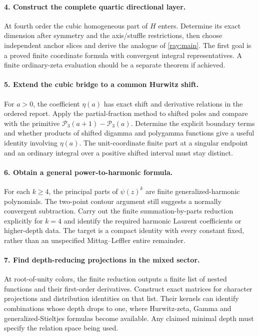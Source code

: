 \paragraph{4. Construct the complete quartic directional layer.}
At fourth order the cubic homogeneous part of $H$ enters. Determine
its exact dimension after symmetry and the axis/stuffle restrictions,
then choose independent anchor slices and derive the analogue of
\eqref{ray:main}. The first goal is a proved finite coordinate
formula with convergent integral representatives. A finite
ordinary-zeta evaluation should be a separate theorem if achieved.

\paragraph{5. Extend the cubic bridge to a common Hurwitz shift.}
For $a>0$, the coefficient $\eta(a)$ has exact shift and derivative
relations in the ordered report. Apply the partial-fraction method
to shifted poles and compare with the primitive
$\mathcal P_3(a+1)-\mathcal P_3(a)$. Determine the explicit
boundary terms and whether products of shifted digamma and
polygamma functions give a useful identity involving $\eta(a)$.
The unit-coordinate finite part at a singular endpoint and an
ordinary integral over a positive shifted interval must stay distinct.

\paragraph{6. Obtain a general power-to-harmonic formula.}
For each $k\ge4$, the principal parts of $\psi(z)^k$ are finite
generalized-harmonic polynomials. The two-point contour argument
still suggests a normally convergent subtraction. Carry out the
finite summation-by-parts reduction explicitly for $k=4$ and identify
the required harmonic Laurent coefficients or higher-depth data.
The target is a compact identity with every constant fixed, rather
than an unspecified Mittag--Leffler entire remainder.

\paragraph{7. Find depth-reducing projections in the mixed sector.}
At root-of-unity colors, the finite reduction outputs a finite list
of nested functions and their first-order derivatives. Construct
exact matrices for character projections and distribution identities
on that list. Their kernels can identify combinations whose depth
drops to one, where Hurwitz-zeta, Gamma and generalized-Stieltjes
formulas become available. Any claimed minimal depth must specify
the relation space being used.

